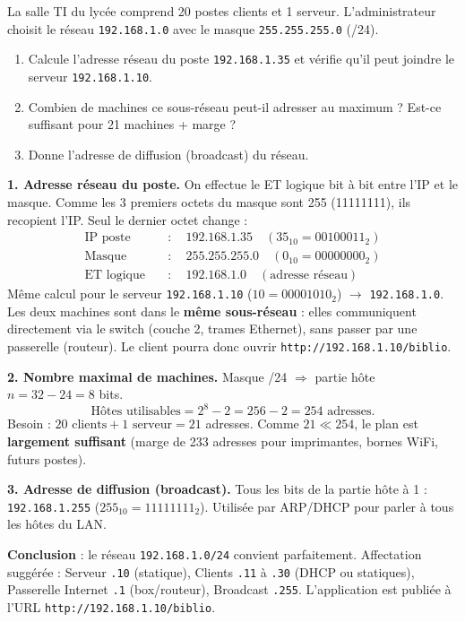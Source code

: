 \documentclass[11pt]{article}
\begin{document}
\begin{exoresolu}
La salle TI du lycée comprend 20 postes clients et 1 serveur. L'administrateur choisit le réseau \texttt{192.168.1.0} avec le masque \texttt{255.255.255.0} (/24).
\begin{enumerate}
\item Calcule l'adresse réseau du poste \texttt{192.168.1.35} et vérifie qu'il peut joindre le serveur \texttt{192.168.1.10}.
\item Combien de machines ce sous-réseau peut-il adresser au maximum ? Est-ce suffisant pour 21 machines + marge ?
\item Donne l'adresse de diffusion (broadcast) du réseau.
\end{enumerate}
\tcblower
\textbf{1. Adresse réseau du poste.} On effectue le ET logique bit à bit entre l'IP et le masque. Comme les 3 premiers octets du masque sont 255 (11111111), ils recopient l'IP. Seul le dernier octet change :
\begin{align*}
\text{IP poste} \quad &: \quad 192.168.1.35 \quad (35_{10} = 00100011_2)\\
\text{Masque} \quad &: \quad 255.255.255.0 \quad (0_{10} = 00000000_2)\\
\text{ET logique} \quad &: \quad 192.168.1.0 \quad (\text{adresse réseau})
\end{align*}
Même calcul pour le serveur \texttt{192.168.1.10} ($10 = 00001010_2$) $\rightarrow$ \texttt{192.168.1.0}.
Les deux machines sont dans le \textbf{même sous-réseau} : elles communiquent directement via le switch (couche 2, trames Ethernet), sans passer par une passerelle (routeur). Le client pourra donc ouvrir \texttt{http://192.168.1.10/biblio}.

\textbf{2. Nombre maximal de machines.} Masque /24 $\Rightarrow$ partie hôte $n = 32 - 24 = 8$ bits.
\[
\text{Hôtes utilisables} = 2^{8} - 2 = 256 - 2 = 254 \text{ adresses.}
\]
Besoin : $20 \text{ clients} + 1 \text{ serveur} = 21$ adresses. Comme $21 \ll 254$, le plan est \textbf{largement suffisant} (marge de 233 adresses pour imprimantes, bornes WiFi, futurs postes).

\textbf{3. Adresse de diffusion (broadcast).} Tous les bits de la partie hôte à 1 : \texttt{192.168.1.255} ($255_{10} = 11111111_2$). Utilisée par ARP/DHCP pour parler à tous les hôtes du LAN.

\textbf{Conclusion} : le réseau \texttt{192.168.1.0/24} convient parfaitement. Affectation suggérée : Serveur \texttt{.10} (statique), Clients \texttt{.11} à \texttt{.30} (DHCP ou statiques), Passerelle Internet \texttt{.1} (box/routeur), Broadcast \texttt{.255}. L'application est publiée à l'URL \texttt{http://192.168.1.10/biblio}.
\end{exoresolu}
\end{document}
